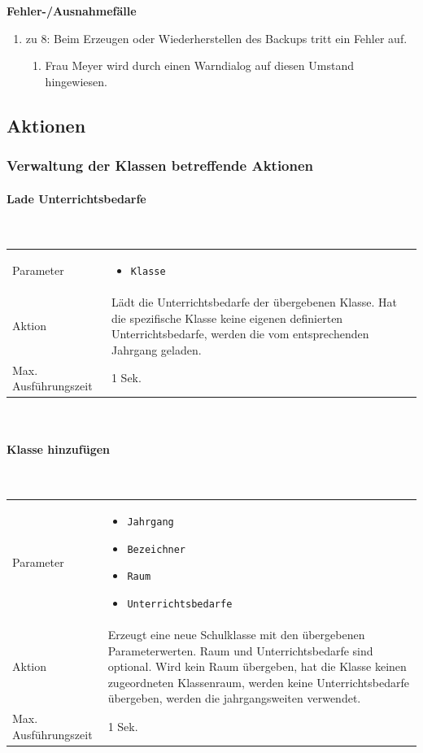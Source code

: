 \documentclass[fontsize=12pt,paper=a4,twoside]{scrartcl}
\begin{document}
\textbf{Fehler-/Ausnahmefälle}
\begin{enumerate}
\item zu 8: Beim Erzeugen oder Wiederherstellen des Backups tritt ein Fehler auf.
	\begin{enumerate}[label=\arabic*.]
	\item Frau Meyer wird durch einen Warndialog auf diesen Umstand hingewiesen.
	\end{enumerate}
\end{enumerate}


\subsection{Aktionen}

\subsubsection{Verwaltung der Klassen betreffende Aktionen}

\paragraph{Lade Unterrichtsbedarfe}\mbox{}\\

\begin{tabularx}{\textwidth}{p{4cm}X}
Parameter & \begin{itemize}[itemsep=0pt, leftmargin = 0.5cm]
			\item \texttt{Klasse}
			\end{itemize}\\
Aktion & Lädt die Unterrichtsbedarfe der übergebenen Klasse. Hat die spezifische Klasse keine eigenen definierten Unterrichtsbedarfe, werden die vom entsprechenden Jahrgang geladen.\\
Max. Ausführungszeit & 1 Sek. 
\end{tabularx}\\


\paragraph{Klasse hinzufügen}\mbox{}\\

\begin{tabularx}{\textwidth}{p{4cm}X}
Parameter & \begin{itemize}[itemsep=0pt, leftmargin = 0.5cm]
			\item \texttt{Jahrgang}
			\item \texttt{Bezeichner}
			\item \texttt{Raum}
			\item \texttt{Unterrichtsbedarfe}
			\end{itemize}\\
Aktion & Erzeugt eine neue Schulklasse mit den übergebenen Parameterwerten. Raum und Unterrichtsbedarfe sind optional. Wird kein Raum übergeben, hat die Klasse keinen zugeordneten Klassenraum, werden keine Unterrichtsbedarfe übergeben, werden die jahrgangsweiten verwendet.\\
Max. Ausführungszeit & 1 Sek. 
\end{tabularx}\\
\end{document}
